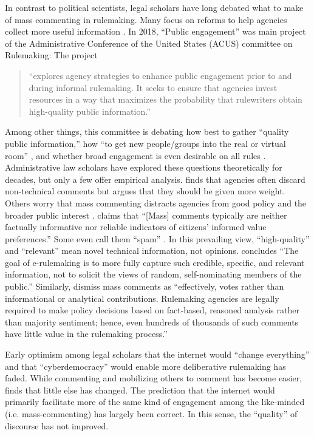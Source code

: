 In contrast to political scientists, legal scholars have long debated what to make of mass commenting in rulemaking. Many focus on reforms to help agencies collect more useful information \citep{Farina2011, Farina2014, Rauch2016}. In 2018, ``Public engagement'' was main project of the Administrative Conference of the United States (ACUS) committee on Rulemaking: %
{The project} 
\begin{quote}``explores agency strategies to enhance public engagement prior to and during informal rulemaking. It seeks to ensure that agencies invest resources in a way that maximizes the probability that rulewriters obtain high-quality public information.'' 
\end{quote} 
Among other things, this committee is debating how best to gather ``quality public information,'' how ``to get new people/groups into the real or virtual room'' \citep{Farina2018}, and whether broad engagement is even desirable on all rules \citep{White2018}. Administrative law scholars have explored these questions theoretically for decades, but only a few offer empirical analysis. \citet{Mendelson2011} finds that agencies often discard non-technical comments but argues that they should be given more weight. Others worry that mass commenting distracts agencies from good policy and the broader public interest \citep{Coglianese2006}. \citet[p. 112]{Farina2012} claims that ``[Mass] comments typically are neither factually informative nor reliable indicators of citizens’ informed value preferences.'' Some even call them ``spam'' \citep{Balla2018}. In this prevailing view, ``high-quality'' and ``relevant'' mean novel technical information, not opinions. \citet[p. 208]{Herz2016} concludes ``The goal of e-rulemaking is to more fully capture such credible, specific, and relevant information, not to solicit the views of random, self-nominating members of the public.'' Similarly,  \citet[p. 4]{Epstein2014} dismiss mass comments as ``effectively, votes rather than informational or analytical contributions. Rulemaking agencies are legally required to make policy decisions based on fact-based, reasoned analysis rather than majority sentiment; hence, even hundreds of thousands of such comments have little value in the rulemaking process.''

Early optimism among legal scholars that the internet would ``change everything'' \citep{Johnson1998} and that ``cyberdemocracy''  would enable more deliberative rulemaking has faded.  
While commenting and mobilizing others to comment has become easier, \citet{Coglianese2006} finds that little else has changed. %
The prediction that the internet would primarily facilitate more of the same kind of engagement among the like-minded (i.e. mass-commenting) \citep{Sunstein2001} has largely been correct. In this sense, the ``quality'' of discourse has not improved.

